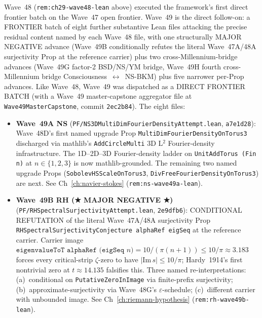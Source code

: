 \begin{remark}\label{rem:ch29-wave49-lean}
Wave~48 (\texttt{rem:ch29-wave48-lean} above) executed the framework's first direct frontier batch on the Wave~47 open frontier. Wave~49 is the direct follow-on: a FRONTIER batch of eight further substantive Lean files attacking the precise residual content named by each Wave~48 file, with one structurally MAJOR NEGATIVE advance (Wave~49B conditionally refutes the literal Wave~47A/48A surjectivity Prop at the reference carrier) plus two cross-Millennium-bridge advances (Wave~49G factor-2 BSD/NS/YM bridge, Wave~49H fourth cross-Millennium bridge Consciousness~$\leftrightarrow$~NS-BKM) plus five narrower per-Prop advances. Like Wave~48, Wave~49 was dispatched as a DIRECT FRONTIER BATCH (with a Wave~49 master-capstone aggregator file at \texttt{Wave49MasterCapstone}, commit \texttt{2ec2b84}). The eight files:
\begin{itemize}
  \item \textbf{Wave~49A NS} (\texttt{PF/NS3DMultiDimFourierDensityAttempt.lean}, \texttt{a7e1d28}): Wave~48D's first named upgrade Prop \texttt{MultiDimFourierDensityOnTorus3} discharged via mathlib's \texttt{AddCircleMulti} 3D L$^2$ Fourier-density infrastructure. The 1D--2D--3D Fourier-density ladder on \texttt{UnitAddTorus (Fin n)} at $n \in \{1, 2, 3\}$ is now mathlib-grounded. The remaining two named upgrade Props (\texttt{SobolevHSScaleOnTorus3}, \texttt{DivFreeFourierDensityOnTorus3}) are next. See Ch~\ref{ch:navier-stokes} (\texttt{rem:ns-wave49a-lean}).
  \item \textbf{Wave~49B RH (★ MAJOR NEGATIVE ★)} (\texttt{PF/RHSpectralSurjectivityAttempt.lean}, \texttt{2e9dfb6}): CONDITIONAL REFUTATION of the literal Wave~47A/48A surjectivity Prop \texttt{RHSpectralSurjectivityConjecture alphaRef eigSeq} at the reference carrier. Carrier image $\texttt{eigenvalueToT alphaRef (eigSeq } n\texttt{)} = 10/(\pi(n+1)) \leq 10/\pi \approx 3.183$ forces every critical-strip $\zeta$-zero to have $|\mathrm{Im}\,s| \leq 10/\pi$; Hardy~1914's first nontrivial zero at $t \approx 14.135$ falsifies this. Three named re-interpretations: (a)~conditional on \texttt{PutativeZeroInImage} via finite-prefix surjectivity; (b)~approximate-surjectivity via Wave~48G's $\varepsilon$-schedule; (c)~different carrier with unbounded image. See Ch~\ref{ch:riemann-hypothesis} (\texttt{rem:rh-wave49b-lean}).

\end{itemize}
\end{remark}
